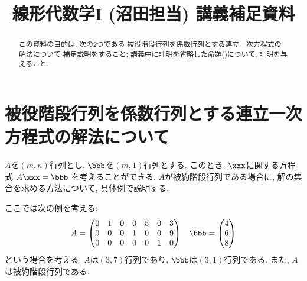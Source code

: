 \title{線形代数学I (沼田担当) 講義補足資料}
\author{}
\date{}
\maketitle

\begin{abstract}
  この資料の目的は, 次の2つである
  被役階段行列を係数行列とする連立一次方程式の解法について
  補足説明をすること;
  講義中に証明を省略した命題()について,
証明を与えること.
\end{abstract}

\section{被役階段行列を係数行列とする連立一次方程式の解法について}
$A$を$(m,n)$行列とし, $\bbb$を$(m,1)$行列とする.
このとき, $\xxx$に関する方程式
$A\xxx=\bbb$
を考えることができる.
$A$が被約階段行列である場合に,
解の集合を求める方法について,
具体例で説明する.

ここでは次の例を考える:
\begin{align*}
  A&=
  \begin{pmatrix}
    0&1&0&0&5&0&3\\
    0&0&0&1&0&0&9\\
    0&0&0&0&0&1&0
  \end{pmatrix}
  &
  \bbb=
  \begin{pmatrix}
    4\\
    6\\
    8
  \end{pmatrix}
\end{align*}
という場合を考える.
$A$は$(3,7)$行列であり,
$\bbb$は$(3,1)$行列である.
また, $A$は被約階段行列である.

